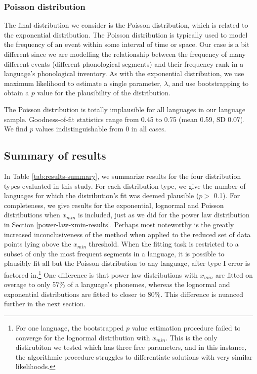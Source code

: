 \hypertarget{poisson-distribution}{%
\subsubsection{Poisson distribution}\label{poisson-distribution}}

The final distribution we consider is the Poisson distribution, which is related to the exponential distribution. The Poisson distribution is typically used to model the frequency of an event within some interval of time or space. Our case is a bit different since we are modelling the relationship between the frequency of many different events (different phonological segments) and their frequency rank in a language's phonological inventory. As with the exponential distribution, we use maximum likelihood to estimate a single parameter, \(\lambda\), and use bootstrapping to obtain a \(p\) value for the plausibility of the distribution.

The Poisson distribution is totally implausible for all languages in our language sample. Goodness-of-fit statistics range from 0.45 to 0.75 (mean 0.59, SD 0.07). We find \(p\) values indistinguishable from 0 in all cases.

\hypertarget{summary-of-results}{%
\subsection{Summary of results}\label{summary-of-results}}

In Table \ref{tab:results-summary}, we summarize results for the four distribution types evaluated in this study. For each distribution type, we give the number of languages for which the distribution's fit was deemed plausible (\(p >\) 0.1). For completeness, we give results for the exponential, lognormal and Poisson distributions when \(x_{min}\) is included, just as we did for the power law distribution in Section \ref{power-law-xmin-results}. Perhaps most noteworthy is the greatly increased inconclusiveness of the method when applied to the reduced set of data points lying above the \(x_{min}\) threshold. When the fitting task is restricted to a subset of only the most frequent segments in a language, it is possible to plausibly fit all but the Poisson distribution to any language, after type I error is factored in.\footnote{For one language, the bootstrapped \(p\) value estimation procedure failed to converge for the lognormal distribution with \(x_{min}\). This is the only distirubiton we tested which has three free parameters, and in this instance, the algorithmic procedure struggles to differentiate solutions with very similar likelihoods.} One difference is that power law distributions with \(x_{min}\) are fitted on overage to only 57\% of a language's phonemes, whereas the lognormal and exponential distributions are fitted to closer to 80\%. This difference is nuanced further in the next section.

